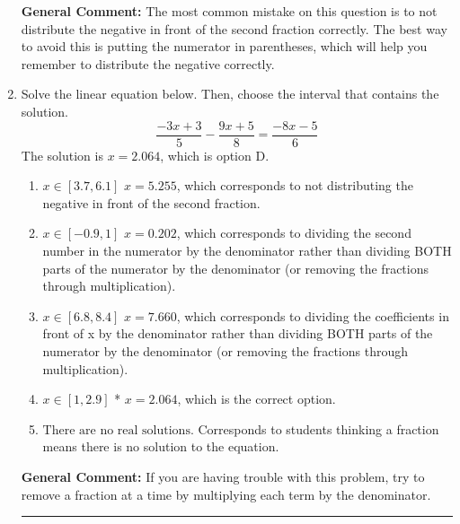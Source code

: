 \documentclass{extbook}[14pt]
\newcommand{\litem}[1]{\item #1

\rule{\textwidth}{0.4pt}}
\begin{document}
\begin{enumerate}
{\textbf{General Comment:} The most common mistake on this question is to not distribute the negative in front of the second fraction correctly. The best way to avoid this is putting the numerator in parentheses, which will help you remember to distribute the negative correctly.
}

\litem{
Solve the linear equation below. Then, choose the interval that contains the solution.
\[ \frac{-3x + 3}{5} - \frac{9x + 5}{8} = \frac{-8x -5}{6} \]
The solution is \( x = 2.064 \), which is option D.\begin{enumerate}[label=\Alph*.]
\item \( x \in [3.7, 6.1] \)
 $x = 5.255$, which corresponds to not distributing the negative in front of the second fraction.
\item \( x \in [-0.9, 1] \)
 $x = 0.202$, which corresponds to dividing the second number in the numerator by the denominator rather than dividing BOTH parts of the numerator by the denominator (or removing the fractions through multiplication).
\item \( x \in [6.8, 8.4] \)
 $x = 7.660$, which corresponds to dividing the coefficients in front of x by the denominator rather than dividing BOTH parts of the numerator by the denominator (or removing the fractions through multiplication).
\item \( x \in [1, 2.9] \)
* $x = 2.064$, which is the correct option.
\item \( \text{There are no real solutions.} \)
Corresponds to students thinking a fraction means there is no solution to the equation.
\end{enumerate}

\textbf{General Comment:} If you are having trouble with this problem, try to remove a fraction at a time by multiplying each term by the denominator.
}
\end{enumerate}
\end{document}
